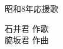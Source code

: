 \documentclass[10pt,b5j]{tarticle} %
\begin{document}
\begin{minipage}[c]{0.7\hsize} %
    \begin{center}
        {\LARGE
            昭和8年応援歌 %
        }
        {\small 
        }
    \end{center}
\end{minipage}
\begin{minipage}[c]{0.3\hsize} %
    \begin{flushright} %
        石井君 作歌\\脇坂君 作曲 %
    \end{flushright}
\end{minipage}
\end{document}
